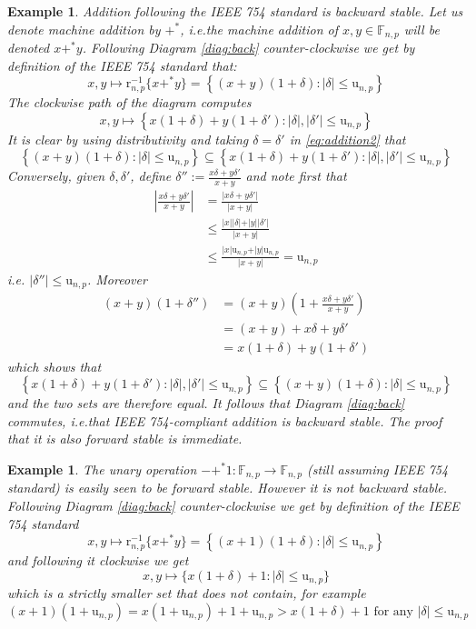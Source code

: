 \documentclass[10pt,a4paper]{article}
\theoremstyle{plain}
\newtheorem{example}[theorem]{Example}
\theoremstyle{definition}
\newcommand{\F}[1][n,p]{\mathbb{F}_{#1}}
\newcommand{\Round}[1][n,p]{\mathrm{r}_{#1}}
\newcommand{\uro}[1][n,p]{\mathrm{u}_{#1}}
\newcommand{\absv}[1]{\vert #1\vert}
\newcommand{\inv}{^{-1}}
\begin{document}
\begin{example}
Addition following the IEEE 754 standard is backward stable. Let us denote machine addition by $+^\ast$, i.e.\@ the machine addition of $x,y\in \F$ will be denoted $x+^\ast y$. Following Diagram \eqref{diag:back} counter-clockwise we get by definition of the IEEE 754 standard that:
\begin{equation}\label{eq:addition1}
x,y\mapsto \Round\inv\{x+^\ast y\}=\left\{(x+y)(1+\delta): \absv{\delta}\leq \uro\right\}
\end{equation}
The clockwise path of the diagram computes
\begin{equation}\label{eq:addition2}
x,y\mapsto \left\{x(1+\delta)+y(1+\delta') :  \absv{\delta},\absv{\delta'}\leq \uro\right\}
\end{equation}
It is clear by using distributivity and taking $\delta=\delta'$ in \eqref{eq:addition2} that 
\[
\left\{(x+y)(1+\delta): \absv{\delta}\leq \uro\right\}\subseteq \left\{x(1+\delta)+y(1+\delta') : \absv{\delta},\absv{\delta'}\leq \uro\right\}
\]
Conversely, given $\delta,\delta'$, define $\delta'':=\frac{x\delta+y\delta'}{x+y}$ and note first that
\begin{align*}
\left\vert \frac{x\delta+y\delta'}{x+y}\right\vert & = \frac{\absv{x\delta+y\delta'}}{\absv{x+y}}\\
&\leq \frac{\absv{x}\absv{\delta}+\absv{y}\absv{\delta'}}{\absv{x+y}}\\
&\leq \frac{\absv{x}\uro+\absv{y}\uro}{\absv{x+y}}=\uro
\end{align*}
i.e. $\absv{\delta''}\leq \uro$. Moreover
\begin{align*}
(x+y)(1+\delta'')&=(x+y)\left(1+\frac{x\delta+y\delta'}{x+y}\right)\\
&=(x+y)+x\delta+y\delta'\\
&=x(1+\delta)+y(1+\delta')
\end{align*}
which shows that 
\[
\left\{x(1+\delta)+y(1+\delta'): \absv{\delta},\absv{\delta'}\leq \uro\right\}\subseteq \left\{(x+y)(1+\delta): \absv{\delta}\leq \uro\right\}
\]
and the two sets are therefore equal. It follows that Diagram \eqref{diag:back} commutes, i.e.\@ that IEEE 754-compliant addition is backward stable. The proof that it is also forward stable is immediate.
\end{example}

\begin{example}
The unary operation $-+^\ast 1: \F\to\F$ (still assuming IEEE 754 standard) is easily seen to be forward stable. However it is not backward stable. Following Diagram \eqref{diag:back} counter-clockwise we get by definition of the IEEE 754 standard
\[
x,y\mapsto \Round\inv\{x+^\ast y\}=\left\{(x+1)(1+\delta): \absv{\delta}\leq \uro\right\}
\]
and following it clockwise we get
\[
x,y\mapsto \{x(1+\delta)+1:\absv{\delta}\leq \uro\}
\]
which is a strictly smaller set that does not contain, for example
\[
(x+1)(1+\uro)=x(1+\uro)+1+\uro>x(1+\delta)+1 \text{ for any }\absv{\delta}\leq\uro
\]
\end{example}
\end{document}
